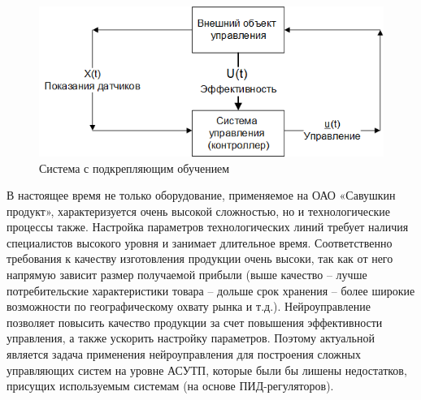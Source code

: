 \begin{figure}[H]
    \centering
    \includegraphics{images/intro/Система с подкрепляющим обучением.png}
    \caption{Система с подкрепляющим обучением}
    \label{fig:reinforce_learning_system}
\end{figure}

В настоящее время не только оборудование, применяемое на ОАО «Савушкин продукт», характеризуется очень высокой сложностью, но и технологические процессы также. Настройка параметров технологических линий требует наличия специалистов высокого уровня и занимает длительное время. Соответственно требования к качеству изготовления продукции очень высоки, так как от него напрямую зависит размер получаемой прибыли (выше качество – лучше потребительские характеристики товара – дольше срок хранения – более широкие возможности по географическому охвату рынка и т.д.). Нейроуправление позволяет повысить качество продукции за счет повышения эффективности управления, а также ускорить настройку параметров. Поэтому актуальной является задача применения нейроуправления для построения сложных управляющих систем на уровне АСУТП, которые были бы лишены недостатков, присущих используемым системам (на основе ПИД-регуляторов).
